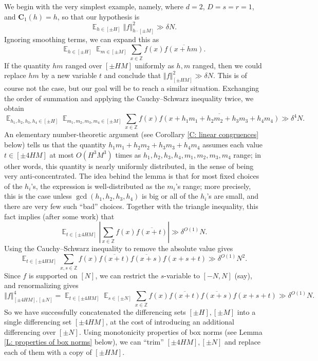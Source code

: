 \documentclass[11pt]{amsart}
\theoremstyle{definition}
\DeclareMathOperator*{\E}{\mathbb{E}}
\newcommand{\Z}{{\mathbb Z}}
\newcommand{\bc}{{\mathbf{C}}}
\newcommand{\norm}[1]{\left\Vert #1\right\Vert}
\newcommand{\abs}[1]{\mathopen{}\left| #1\mathclose{}\right|}
\begin{document}
We begin with the very simplest example, namely, where $d=2$, $D=s=r=1$, and $\bc_1(h)=h$, so that our hypothesis is
$$\E_{h \in [\pm H]} \norm{f}^2_{h \cdot [\pm M]} \gg \delta N.$$
Ignoring smoothing terms, we can expand this as
$$\E_{h \in [ \pm H]} \E_{m \in [\pm M]} \sum_{x \in \mathbb{Z}} f(x)\overline{f(x+hm)}.$$
If the quantity $hm$ ranged over $[\pm HM]$ uniformly as $h,m$ ranged, then we could replace $hm$ by a new variable $t$ and conclude that $\norm{f}_{[\pm HM]}^2 \gg \delta N$.  This is of course not the case, but our goal will be to reach a similar situation.  Exchanging the order of summation and applying the Cauchy--Schwarz inequality twice, we obtain
$$\E_{h_1,h_2,h_3,h_4 \in [\pm H]}\E_{m_1,m_2,m_3,m_4 \in [\pm M]} \sum_{x \in \Z}f(x) \overline{f(x+h_1m_1+h_2m_2+h_3m_3+h_4m_4)} \gg \delta^4 N.$$
An elementary number-theoretic argument (see Corollary \ref{C: linear congruences} below) tells us that the quantity $h_1m_1+h_2m_2+h_3m_3+h_4m_4$ assumes each value $t \in [\pm 4HM]$ at most $O(H^3M^3)$ times as $h_1,h_2,h_3,h_4,m_1,m_2,m_3,m_4$ range; in other words, this quantity is nearly uniformly distributed, in the sense of being very anti-concentrated.  The idea behind the lemma is that for most fixed choices of the $h_i$'s, the expression is well-distributed as the $m_i$'s range; more precisely, this is the case unless $\gcd(h_1,h_2,h_3,h_4)$ is big or all of the $h_i$'s are small, and there are very few such ``bad'' choices.  
Together with the triangle inequality, this fact implies (after some work) that
$$\E_{t \in [\pm 4HM
]}\abs{\sum_{x \in \Z} f(x)\overline{f(x+t)}} \gg \delta^{O(1)} N.$$
Using the Cauchy--Schwarz inequality to remove the absolute value gives
$$\E_{t \in [\pm 4HM
]}\sum_{x,s \in \Z} f(x)\overline{f(x+t)}\overline{f(x+s)}f(x+s+t) \gg \delta^{O(1)} N^2.$$
Since $f$ is supported on $[N]$, we can restrict the $s$-variable to $[-N,N]$ (say), and renormalizing gives
$$\norm{f}^4_{[\pm 4HM],[\pm N]}=\E_{t \in [\pm 4HM]}\E_{s \in [\pm N]}\sum_{x \in \Z}f(x)\overline{f(x+t)}\overline{f(x+s)}f(x+s+t) \gg \delta^{O(1)} N.$$
So we have successfully concatenated the differencing sets $[\pm H], [\pm M]$ into a single differencing set $[\pm 4HM]$, at the cost of introducing an additional differencing over $[\pm N]$.  Using monotonicity properties of box norms (see Lemma \ref{L: properties of box norms} below), we can ``trim'' $[\pm 4HM],[\pm N]$ and replace each of them with a copy of $[\pm HM]$.
\end{document}
